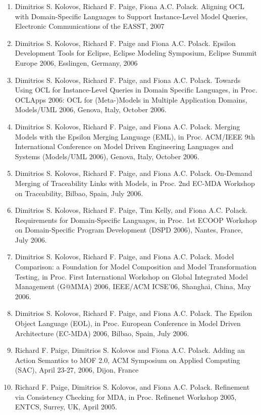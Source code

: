 \begin{enumerate}
	\item Dimitrios S. Kolovos, Richard F. Paige, Fiona A.C. Polack. Aligning OCL with Domain-Specific Languages to Support Instance-Level Model Queries, Electronic Communications of the EASST, 2007
	\item Dimitrios S. Kolovos, Richard F. Paige and Fiona A.C. Polack. Epsilon Development Tools for Eclipse, Eclipse Modeling Symposium, Eclipse Summit Europe 2006, Esslingen, Germany, 2006
	\item Dimitrios S. Kolovos, Richard F. Paige, and Fiona A.C. Polack. Towards Using OCL for Instance-Level Queries in Domain Specific Languages, in Proc. OCLApps 2006: OCL for (Meta-)Models in Multiple Application Domains, Models/UML 2006, Genova, Italy, October 2006.
	\item Dimitrios S. Kolovos, Richard F. Paige, and Fiona A.C. Polack. Merging Models with the Epsilon Merging Language (EML), in Proc. ACM/IEEE 9th International Conference on Model Driven Engineering Languages and Systems (Models/UML 2006), Genova, Italy, October 2006.
	\item Dimitrios S. Kolovos, Richard F. Paige, and Fiona A.C. Polack. On-Demand Merging of Traceability Links with Models, in Proc. 2nd EC-MDA Workshop on Traceability, Bilbao, Spain, July 2006.
	\item Dimitrios S. Kolovos, Richard F. Paige, Tim Kelly, and Fiona A.C. Polack. Requirements for Domain-Specific Languages, in Proc. 1st ECOOP Workshop on Domain-Specific Program Development (DSPD 2006), Nantes, France, July 2006.
	\item Dimitrios S. Kolovos, Richard F. Paige, and Fiona A.C. Polack. Model Comparison: a Foundation for Model Composition and Model Transformation Testing, in Proc. First International Workshop on Global Integrated Model Management (G@MMA) 2006, IEEE/ACM ICSE'06, Shanghai, China, May 2006.
	\item Dimitrios S. Kolovos, Richard F. Paige, and Fiona A.C. Polack. The Epsilon Object Language (EOL), in Proc. European Conference in Model Driven Architecture (EC-MDA) 2006, Bilbao, Spain, July 2006.
	\item Richard F. Paige, Dimitrios S. Kolovos and Fiona A.C. Polack. Adding an Action Semantics to MOF 2.0, ACM Symposium on Applied Computing (SAC), April 23-27, 2006, Dijon, France
	\item Richard F. Paige, Dimitrios S. Kolovos, and Fiona A.C. Polack. Refinement via Consistency Checking for MDA, in Proc. Refinenet Workshop 2005, ENTCS, Surrey, UK, April 2005.

\end{enumerate}

